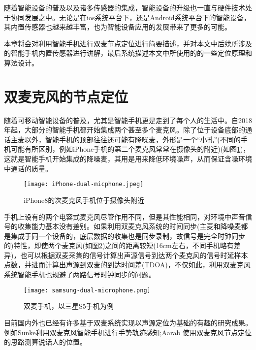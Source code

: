\documentclass[winfonts,oneside]{njuthesis}
\begin{document}
	随着智能设备的普及以及诸多传感器的集成，智能设备的升级也一直与硬件技术处于协同发展之中。无论是在ios系统平台下，还是Android系统平台下的智能设备，其内置传感器也越来越丰富，也为智能设备应用的发展带来了更多的可能。

	本章将会对利用智能手机进行双麦节点定位进行简要描述，并对本文中后续所涉及的智能手机内置传感器进行讲解，最后系统描述本文中所使用的的一些定位原理和算法设计。

	\section{双麦克风的节点定位}
	
	随着可移动智能设备的普及，尤其是智能手机更是走到了每个人的生活中。自2018年起，大部分的智能手机都开始集成两个甚至多个麦克风。除了位于设备底部的通话主麦以外，智能手机的顶部往往还可能有降噪麦，外形是一个“小孔”(不同的手机可能有所区别，例如iPhone手机的第二个麦克风常常在摄像头的附近)(如图\ref{fig: iphone-dual-microphone})，这就是智能手机开始集成的降噪麦，其用是用来降低环境噪声，从而保证含噪环境中通话的质量。
	
	\begin{figure}[H]
		\centering
		\texttt{[image: iPhone-dual-micphone.jpeg]} 
		\caption{iPhone8的次麦克风手机位于摄像头附近}
		\label{fig: iphone-dual-microphone}
	\end{figure}
	
	手机上设有的两个电容式麦克风尽管作用不同，但是其性能相同，对环境中声音信号的收集能力基本没有差别。如果利用双麦克风系统的时间同步(主麦和降噪麦都是集成于同一个设备的，底层数据的收集也是同步录制，故信号是完全时钟同步的)特性，即使两个麦克风(如图\ref{fig: samsung-dual-microphone})之间的距离较短(16cm左右，不同手机略有差异)，也可以根据双麦采集的信号计算出声源信号到达两个麦克风的信号时延样本点数，并进而计算出声源到双麦的到达时间差(TDOA)，不仅如此，利用双麦克风系统智能手机也规避了两路信号时钟同步的问题。
	
	\begin{figure}[H]
		\centering
		\texttt{[image: samsung-dual-microphone.png]} 
		\caption{双麦手机，以三星S5手机为例}
		\label{fig: samsung-dual-microphone}
	\end{figure}
	
	目前国内外也已经有许多基于双麦系统实现以声源定位为基础的有趣的研究成果。例如Sunke利用双麦克风智能手机进行手势轨迹感知\cite{VSkin};Aarab 使用双麦克风节点定位的思路测算说话人的位置\cite{DMArrays}。
	
\end{document}
